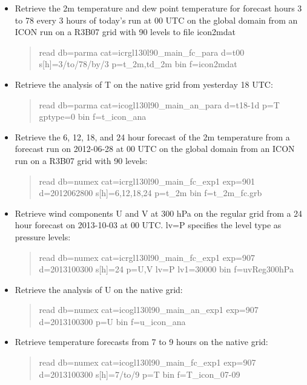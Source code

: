 \begin{itemize}
\item Retrieve the 2m temperature and dew point temperature 
 for forecast hours 3 to 78 every 3 hours of today's run at 00 UTC
 on the global domain from an ICON run on a R3B07 grid with 90 levels to file icon2mdat

\begin{quote}
read db=parma cat=icrgl130l90\_main\_fc\_para d=t00 s[h]=3/to/78/by/3 p=t\_2m,td\_2m bin f=icon2mdat
\end{quote}

\item Retrieve the analysis of T on the native grid from yesterday 18 UTC:
\begin{quote}
read db=parma cat=icogl130l90\_main\_an\_para d=t18-1d p=T gptype=0 bin f=t\_icon\_ana
\end{quote}

\item Retrieve the 6, 12, 18, and 24 hour forecast of the 2m temperature from a forecast
run on 2012-06-28 at 00 UTC on the global domain from an ICON run on a R3B07 grid with 90 levels:

\begin{quote}
read db=numex cat=icrgl130l90\_main\_fc\_exp1 exp=901 d=2012062800 s[h]=6,12,18,24 p=t\_2m bin f=t\_2m\_fc.grb
\end{quote}

\item Retrieve wind components U and V at 300 hPa on the regular grid from a 24 hour forecast on
2013-10-03 at 00 UTC. lv=P specifies the level type as pressure levels:

\begin{quote}
read db=numex cat=icrgl130l90\_main\_fc\_exp1 exp=907 d=2013100300 s[h]=24 p=U,V lv=P lv1=30000 bin f=uvReg300hPa
\end{quote}

\item Retrieve the analysis of U on the native grid:
\begin{quote}
read db=numex cat=icogl130l90\_main\_an\_exp1 exp=907 d=2013100300 p=U bin f=u\_icon\_ana
\end{quote}

\item Retrieve temperature forecasts from 7 to 9 hours on the native grid:
\begin{quote}
read db=numex cat=icogl130l90\_main\_fc\_exp1 exp=907 d=2013100300 s[h]=7/to/9 p=T bin f=T\_icon\_07-09
\end{quote}


\end{itemize}
